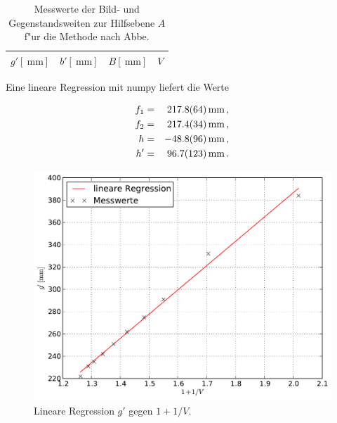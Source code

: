 		\begin{table}[!h]
			\begin{center}
				\label{tabelle:abbe}
				\caption{Messwerte der Bild- und Gegenstandsweiten zur Hilfsebene $A$ f"ur die Methode nach Abbe.}
				\begin{tabular}{|c|c|c|c|}
					\hline 
					$g' [\SI{}{\milli \meter}]$ & $b' [\SI{}{\milli \meter}]$ & $B [\SI{}{\milli \meter}]$ & $V$ \\
					\hline 
					\hline
					
					\hline 
				\end{tabular}
			\end{center}
		\end{table}

		Eine lineare Regression mit numpy liefert die Werte

		\begin{eqnarray*}
			f_1 & = & \SI{217.8 (64)}{\milli \meter} \, , \\
			f_2 & = & \SI{217.4 (34)}{\milli \meter} \, , \\
			h & = & \SI{-48.8 (96)}{\milli \meter} \, , \\
			h' & = & \SI{96.7 (123)}{\milli \meter} \, . \\
		\end{eqnarray*}

		\begin{figure}[h!]
			\centering
			\includegraphics[width = 15cm]{img/graph_abbe_g.pdf}
			\caption{Lineare Regression $g'$ gegen $1 + 1/V$.}
			\label{fig:lin_reg_g}
		\end{figure}

